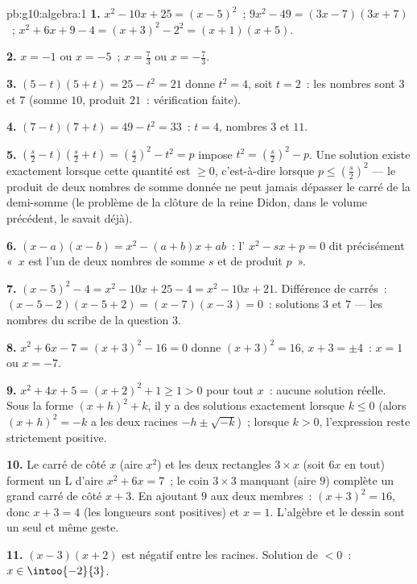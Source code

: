\begin{solution}{pb:g10:algebra:1}
\textbf{1.} $x^2 - 10x + 25 = (x - 5)^2$~;
$9x^2 - 49 = (3x - 7)(3x + 7)$~;
$x^2 + 6x + 9 - 4 = (x + 3)^2 - 2^2 = (x + 1)(x + 5)$.

\textbf{2.} $x = -1$ ou $x = -5$~; \quad $x = \frac73$ ou
$x = -\frac73$.

\textbf{3.} $(5 - t)(5 + t) = 25 - t^2 = 21$ donne $t^2 = 4$, soit
$t = 2$~: les nombres sont $3$ et $7$ (somme $10$, produit $21$~:
vérification faite).

\textbf{4.} $(7 - t)(7 + t) = 49 - t^2 = 33$~: $t = 4$, nombres $3$
et $11$.

\textbf{5.} $\left(\frac s2 - t\right)\left(\frac s2 + t\right)
= \left(\frac s2\right)^2 - t^2 = p$ impose
$t^2 = \left(\frac s2\right)^2 - p$. Une solution existe exactement
lorsque cette quantité est $\geq 0$, c'est-à-dire lorsque
$p \leq \left(\frac s2\right)^2$ --- le produit de deux nombres de
somme donnée ne peut jamais dépasser le carré de la demi-somme (le
problème de la clôture de la reine Didon, dans le volume précédent, le
savait déjà).

\textbf{6.} $(x - a)(x - b) = x^2 - (a + b)x + ab$~: l'
$x^2 - sx + p = 0$ dit précisément «~$x$ est l'un de deux nombres de
somme $s$ et de produit $p$~».

\textbf{7.} $(x-5)^2 - 4 = x^2 - 10x + 25 - 4 = x^2 - 10x + 21$.
Différence de carrés~:
$(x - 5 - 2)(x - 5 + 2) = (x - 7)(x - 3) = 0$~: solutions $3$ et $7$
--- les nombres du scribe de la question 3.

\textbf{8.} $x^2 + 6x - 7 = (x + 3)^2 - 16 = 0$ donne
$(x + 3)^2 = 16$, $x + 3 = \pm 4$~: $x = 1$ ou $x = -7$.

\textbf{9.} $x^2 + 4x + 5 = (x + 2)^2 + 1 \geq 1 > 0$ pour tout $x$~:
aucune solution réelle. Sous la forme $(x + h)^2 + k$, il y a des
solutions exactement lorsque $k \leq 0$ (alors $(x+h)^2 = -k$ a les
deux racines $-h \pm \sqrt{-k}$)~; lorsque $k > 0$, l'expression reste
strictement positive.

\textbf{10.} Le carré de côté $x$ (aire $x^2$) et les deux rectangles
$3 \times x$ (soit $6x$ en tout) forment un L d'aire
$x^2 + 6x = 7$~; le coin $3 \times 3$ manquant (aire $9$) complète un
grand carré de côté $x + 3$. En ajoutant $9$ aux deux membres~:
$(x + 3)^2 = 16$, donc $x + 3 = 4$ (les longueurs sont positives) et
$x = 1$. L'algèbre et le dessin sont un seul et même geste.

\textbf{11.} $(x-3)(x+2)$ est négatif entre les racines. Solution de
$< 0$~: $x \in \intoo{-2}{3}$.


\end{solution}
